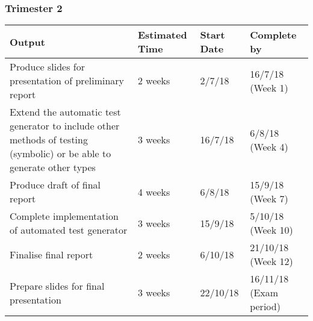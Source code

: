 \documentclass[11pt, a4paper, twoside, openright]{report}
\begin{document}
\subsubsection*{Trimester 2}
\begin{tabular}{ |p{10cm}|p{3cm}|p{2cm}|p{2cm}| }
	\hline
	\textbf{Output} & \textbf{Estimated Time} & \textbf{Start Date} & \textbf{Complete by}\\
	\hline
	Produce slides for presentation of preliminary report & 2 weeks & 2/7/18 & 16/7/18 (Week 1)\\
	\hline
	Extend the automatic test generator to include other methods of testing (symbolic) or be able to generate other types & 3 weeks & 16/7/18 & 6/8/18 (Week 4)\\
	\hline
	Produce draft of final report & 4 weeks & 6/8/18 & 15/9/18 (Week 7)\\
	\hline
	Complete implementation of automated test generator & 3 weeks & 15/9/18 & 5/10/18 (Week 10) \\
	\hline
	Finalise final report & 2 weeks & 6/10/18 & 21/10/18 (Week 12) \\
	\hline
	Prepare slides for final presentation & 3 weeks & 22/10/18 & 16/11/18 (Exam period)\\
	\hline
\end{tabular}

%
%
%
%
\end{document}
